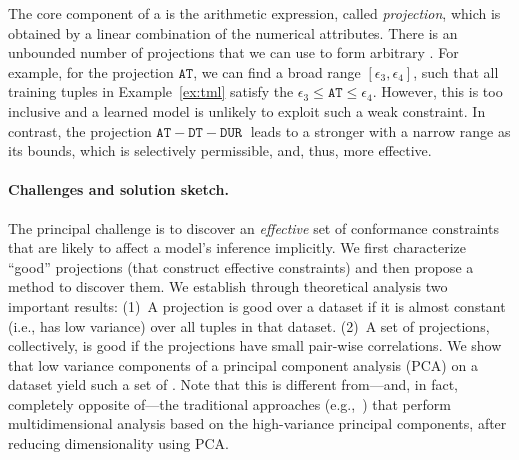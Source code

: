  The core component of a \di is the arithmetic expression, called
\emph{projection}, which is obtained by a linear combination of the numerical
attributes. There is an unbounded number of projections that we can use to form
arbitrary \dis. For example, for the projection $\mathtt{AT}$, we can find a
broad range $[\epsilon_3, \epsilon_4]$, such that all training tuples in
Example~\ref{ex:tml} satisfy the \di $\epsilon_3 \le \mathtt{AT} \le
\epsilon_4$. However, this \invariant is too inclusive and a learned model is
unlikely to exploit such a weak constraint. In contrast, the projection
$\mathtt{AT} - \mathtt{DT} - \mathtt{DUR}\;$ leads to a stronger \di with a
narrow range as its bounds, which is selectively permissible, and, thus, more
effective.

\smallskip

\paragraph{Challenges and solution sketch.} The principal challenge is to
discover an \emph{effective} set of conformance constraints that are likely to
affect a model's inference implicitly. We first characterize ``good''
projections (that construct effective constraints) and then propose a method to
discover them. We establish through theoretical analysis two important results:
(1)~A projection is good over a dataset if it is almost constant (i.e., has low
variance) over all tuples in that dataset. (2)~A set of projections,
collectively, is good if the projections have small pair-wise correlations. We
show that low variance components of a principal component analysis (PCA) on a
dataset yield such a set of \views. Note that this is different from---and, in
fact, completely opposite of---the traditional approaches
(e.g.,~\cite{DBLP:conf/kdd/QahtanAWZ15}) that perform multidimensional analysis
based on the high-variance principal components, after reducing dimensionality
using PCA.

\smallskip

